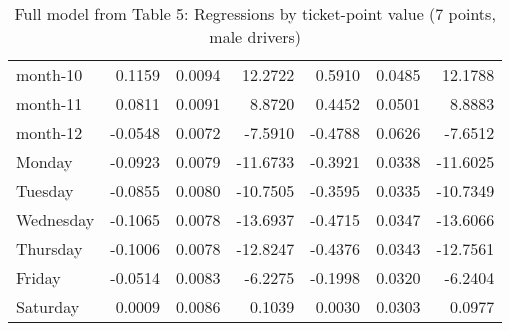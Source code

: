 \documentclass[10pt]{article}
\begin{document}
\begin{table}[ht]
\begin{tabular}{lrrrrrr}
  month-10 & 0.1159 & 0.0094 & 12.2722 & 0.5910 & 0.0485 & 12.1788 \\ 
  month-11 & 0.0811 & 0.0091 & 8.8720 & 0.4452 & 0.0501 & 8.8883 \\ 
  month-12 & -0.0548 & 0.0072 & -7.5910 & -0.4788 & 0.0626 & -7.6512 \\ 
  Monday & -0.0923 & 0.0079 & -11.6733 & -0.3921 & 0.0338 & -11.6025 \\ 
  Tuesday & -0.0855 & 0.0080 & -10.7505 & -0.3595 & 0.0335 & -10.7349 \\ 
  Wednesday & -0.1065 & 0.0078 & -13.6937 & -0.4715 & 0.0347 & -13.6066 \\ 
  Thursday & -0.1006 & 0.0078 & -12.8247 & -0.4376 & 0.0343 & -12.7561 \\ 
  Friday & -0.0514 & 0.0083 & -6.2275 & -0.1998 & 0.0320 & -6.2404 \\ 
  Saturday & 0.0009 & 0.0086 & 0.1039 & 0.0030 & 0.0303 & 0.0977 \\ 
   \hline
\end{tabular}
\caption{Full model from Table 5: Regressions by ticket-point value (7 points, male drivers)} 
\label{tab_5_7_pts_no_age_M}
\end{table}


\clearpage
\pagebreak



\end{document}
